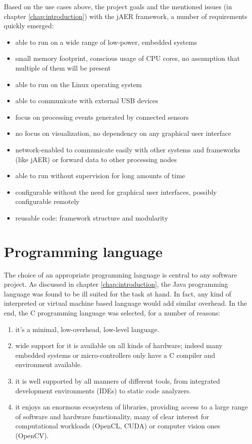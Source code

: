 \documentclass[a4paper,12pt]{report}
\begin{document}
Based on the use cases above, the project goals and the mentioned issues (in chapter \ref{chap:introduction}) with the jAER framework, a number of requirements quickly emerged:
\begin{itemize}
\item able to run on a wide range of low-power, embedded systems
\item small memory footprint, conscious usage of CPU cores, no assumption that multiple of them will be present
\item able to run on the Linux operating system
\item able to communicate with external USB devices
\item focus on processing events generated by connected sensors
\item no focus on visualization, no dependency on any graphical user interface
\item network-enabled to communicate easily with other systems and frameworks (like jAER) or forward data to other processing nodes
\item able to run without supervision for long amounts of time
\item configurable without the need for graphical user interfaces, possibly configurable remotely
\item reusable code: framework structure and modularity
\end{itemize}

\section{Programming language} \label{sec:programming_language}

The choice of an appropriate programming language is central to any software project.
As discussed in chapter \ref{chap:introduction}, the Java programming language was found to be ill suited for the task at hand. In fact, any kind of interpreted or virtual machine based language would add similar overhead.
In the end, the C programming language was selected, for a number of reasons:
\begin{enumerate}
\item it's a minimal, low-overhead, low-level language.
\item wide support for it is available on all kinds of hardware; indeed many embedded systems or micro-controllers only have a C compiler and environment available.
\item it is well supported by all manners of different tools, from integrated development environments (IDEs) to static code analyzers.
\item it enjoys an enormous ecosystem of libraries, providing access to a large range of software and hardware functionality, many of clear interest for computational workloads (OpenCL, CUDA) or computer vision ones (OpenCV).
\end{enumerate}
\end{document}
